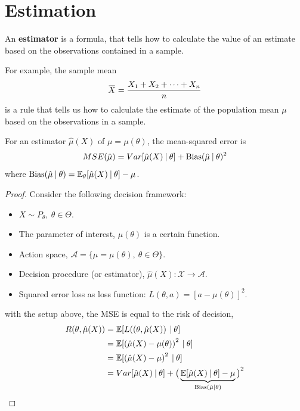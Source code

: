 \chapter{Estimation}

\begin{definition}[Estimator]
    An \textbf{estimator} is a formula, that tells 
    how to calculate the value of an estimate based 
    on the observations contained in a sample.
\end{definition}

For example, the sample mean 
\[
    \ols{X} = \frac{X_1 + X_2 + \cdots + X_n}{n}
\]
is a rule that tells us how to calculate the estimate of the population mean $\mu$ based on the observations in a sample.

\begin{theorem}
    For an estimator $\hat{\mu}(X)$ of $\mu = \mu(\theta)$, the mean-squared error is 
    \begin{equation}
        MSE(\hat{\mu}) = Var[\hat{\mu}(X) \> | \> \theta] + \operatorname*{Bias}(\hat{\mu} \> | \> \theta)^2
    \end{equation}
    where $\operatorname*{Bias} (\hat{\mu} \> | \> \theta) = \mathbb{E}_\theta [\hat{\mu}(X) \> | \> \theta] - \mu$.
\end{theorem}
\begin{proof}
    Consider the following decision framework:
    \begin{itemize}
        \item $X \sim P_\theta,\> \theta \in \Theta$.
        \item The parameter of interest, $\mu(\theta)$ is a certain function.
        \item Action space, $\mathcal{A} = \{ \mu = \mu(\theta), \> \theta \in \Theta \}$.
        \item Decision procedure (or estimator), $\hat{\mu}(X) : \mathcal{X} \to \mathcal{A}$.
        \item Squared error loss as loss function: $L(\theta, a) = [a - \mu(\theta)]^2$.
    \end{itemize}
    with the setup above, the MSE is equal to the risk of decision,
    \begin{align*}
        R(\theta, \hat{\mu}(X)) &= \mathbb{E}[L(\left(\theta, \hat{\mu}(X) \right) \> | \> \theta]\\
        &= \mathbb{E}[\left(\hat{\mu}(X) - \mu(\theta) \right)^2 \> | \> \theta]\\
        &= \mathbb{E}[\left(\hat{\mu}(X) - \mu \right)^2 \> | \> \theta]\\
        &= Var[\hat{\mu}(X) \> | \> \theta] + 
            \big(\underbrace{\mathbb{E}[\hat{\mu}(X) \> | \> \theta] - \mu}_{\operatorname*{Bias}(\hat{\mu} | \theta)} \big)^2
    \end{align*}
\end{proof}

